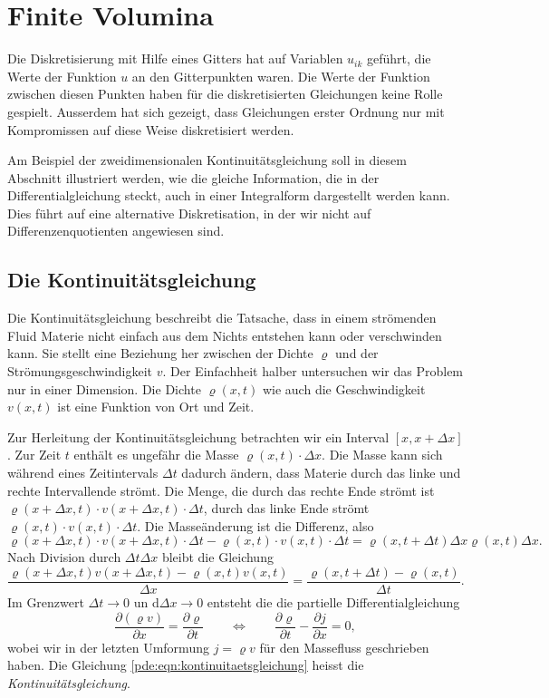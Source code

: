 %
%
%
\section{Finite Volumina
\label{section:finite-volumina}}
Die Diskretisierung mit Hilfe eines Gitters hat auf Variablen $u_{ik}$
geführt, die Werte der Funktion $u$ an den Gitterpunkten waren.
Die Werte der Funktion zwischen diesen Punkten haben für die
diskretisierten Gleichungen keine Rolle gespielt.
Ausserdem hat sich gezeigt, dass Gleichungen erster Ordnung
nur mit Kompromissen auf diese Weise diskretisiert werden.

Am Beispiel der zweidimensionalen Kontinuitätsgleichung soll
in diesem Abschnitt illustriert werden, wie die gleiche Information,
die in der Differentialgleichung steckt, auch in einer Integralform
dargestellt werden kann.
Dies führt auf eine alternative Diskretisation, in der wir nicht
auf Differenzenquotienten angewiesen sind.

\subsection{Die Kontinuitätsgleichung}
Die Kontinuitätsgleichung beschreibt die Tatsache, dass in einem
strömenden Fluid Materie nicht einfach aus dem Nichts entstehen kann
oder verschwinden kann.
Sie stellt eine Beziehung her zwischen der Dichte $\varrho$ und der
Strömungsgeschwindigkeit $v$.
Der Einfachheit halber untersuchen wir das Problem nur in einer
Dimension.
Die Dichte $\varrho(x,t)$ wie auch die Geschwindigkeit $v(x,t)$
ist eine Funktion von Ort und Zeit.

Zur Herleitung der Kontinuitätsgleichung betrachten wir ein
Interval $[x,x+\Delta x]$.
Zur Zeit $t$ enthält es ungefähr die Masse $\varrho(x,t)\cdot\Delta x$.
Die Masse kann sich während eines Zeitintervals $\Delta t$ dadurch
ändern, dass Materie durch das linke und rechte Intervallende strömt.
Die Menge, die durch das rechte Ende strömt ist
$\varrho(x+\Delta x,t)\cdot v(x+\Delta x,t)\cdot \Delta t$,
durch das linke Ende strömt
$\varrho(x,t)\cdot v(x,t)\cdot \Delta t$.
Die Masseänderung ist die Differenz, also
\[
\varrho(x+\Delta x,t)\cdot v(x+\Delta x,t)\cdot \Delta t
-
\varrho(x,t)\cdot v(x,t)\cdot \Delta t
=
\varrho(x,t+\Delta t)\Delta x
\varrho(x,t)\Delta x.
\]
Nach Division durch $\Delta t\Delta x $ bleibt die Gleichung
\[
\frac{\varrho(x+\Delta x,t)v(x+\Delta x,t) - \varrho(x,t)v(x,t)}{\Delta x}
=
\frac{\varrho(x,t+\Delta t)-\varrho(x,t)}{\Delta t}.
\]
Im Grenzwert $\Delta t\to 0$ un d$\Delta x\to 0$ entsteht die
die partielle Differentialgleichung
\begin{equation}
\frac{\partial (\varrho v)}{\partial x} = \frac{\partial \varrho}{\partial t}
\qquad\Leftrightarrow\qquad
\frac{\partial\varrho}{\partial t} - \frac{\partial j}{\partial x}=0,
\label{pde:eqn:kontinuitaetsgleichung}
\end{equation}
wobei wir in der letzten Umformung $j=\varrho v$ für den Massefluss
geschrieben haben.
Die Gleichung \eqref{pde:eqn:kontinuitaetsgleichung} heisst die
{\em Kontinuitätsgleichung}.
%

